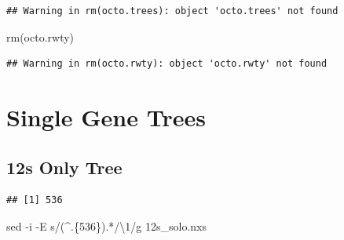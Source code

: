 \documentclass[
]{article}
\newenvironment{Shaded}{\begin{snugshade}}{\end{snugshade}}
\newcommand{\AttributeTok}[1]{\textcolor[rgb]{0.77,0.63,0.00}{#1}}
\newcommand{\DecValTok}[1]{\textcolor[rgb]{0.00,0.00,0.81}{#1}}
\newcommand{\FunctionTok}[1]{\textcolor[rgb]{0.00,0.00,0.00}{#1}}
\newcommand{\NormalTok}[1]{#1}
\newcommand{\OtherTok}[1]{\textcolor[rgb]{0.56,0.35,0.01}{#1}}
\newcommand{\SpecialCharTok}[1]{\textcolor[rgb]{0.00,0.00,0.00}{#1}}
\newcommand{\StringTok}[1]{\textcolor[rgb]{0.31,0.60,0.02}{#1}}
\begin{document}
\begin{verbatim}
## Warning in rm(octo.trees): object 'octo.trees' not found
\end{verbatim}

\begin{Shaded}
\begin{Highlighting}[]
\FunctionTok{rm}\NormalTok{(octo.rwty)}
\end{Highlighting}
\end{Shaded}

\begin{verbatim}
## Warning in rm(octo.rwty): object 'octo.rwty' not found
\end{verbatim}

\hypertarget{single-gene-trees}{%
\section{Single Gene Trees}\label{single-gene-trees}}

\hypertarget{s-only-tree}{%
\subsection{12s Only Tree}\label{s-only-tree}}

\begin{Shaded}
\end{Shaded}

\begin{verbatim}
## [1] 536
\end{verbatim}

\begin{Shaded}
\begin{Highlighting}[]
\FunctionTok{sed} \AttributeTok{{-}i} \AttributeTok{{-}E} \StringTok{\textquotesingle{}s/(\^{}.\{536\}).*/\textbackslash{}1/g\textquotesingle{}}\NormalTok{ 12s\_solo.nxs}
\end{Highlighting}
\end{Shaded}
\end{document}
